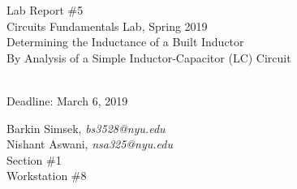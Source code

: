 \documentclass[journal]{IEEEtran}
\begin{document}
\begin{titlepage}
    {\centering
        \vspace*{20em}
        {
        \huge 
        \begin{spacing}{1.5}
            Lab Report \#5
            \\
            Circuits Fundamentals Lab, Spring 2019
            \bigskip
            \Large
            \\
            Determining the Inductance of a Built Inductor\\
            By Analysis of a Simple Inductor-Capacitor (LC) Circuit
  
            \\
            \bigskip
            Deadline: March 6, 2019 
        \end{spacing}

        }
        
    }
    \vfill
    
    {
    \large
    
    \begin{spacing}{1.5}
    \noindent Barkin Simsek, {\it {bs3528@nyu.edu}} 
    \\
    Nishant Aswani, {\it {nsa325@nyu.edu}}
    \\
    Section \#1%
    \\
    Workstation \#8%
    \end{spacing}
    }


\end{titlepage}
{}
\setcounter{page}{1}




%
{}

\end{document}
